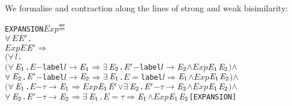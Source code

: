 \documentclass[GCNS]{yincog}
\renewcommand{\HOLConst}[1]{\texttt{#1}}
\renewcommand{\HOLBoundVar}[1]{\ensuremath{\mathit{#1}}}
\renewcommand{\HOLFreeVar}[1]{\ensuremath{\mathit{#1}}}
\renewcommand{\HOLSymConst}[1]{#1}
\renewcommand{\HOLTokenConj}{\ensuremath{\wedge}}
\renewcommand{\HOLTokenDefEquality}{\ensuremath{\mathrel{\overset{\makebox [0pt]{\text{\tiny \textsf{def}}}}{=}}}}
\renewcommand{\HOLTokenExists}{\ensuremath{\exists \,}}
\renewcommand{\HOLTokenForall}{\ensuremath{\forall \,}}
\renewcommand{\HOLTokenDisj}{\ensuremath{\vee}}
\theoremstyle{remark}
\theoremstyle{theorem}
\theoremstyle{remark}
\newcommand{\HOLTokenTransBegin}{$-$}
\newcommand{\HOLTokenTransEnd}{$\rightarrow$\xspace}
\newcommand{\HOLTokenWeakTransBegin}{$=$}
\newcommand{\HOLTokenWeakTransEnd}{$\Rightarrow$\xspace}
\renewcommand{\HOLTokenImp}{\ensuremath{\Longrightarrow}}
\begin{document}
We formalise and contraction along the lines of strong and weak bisimilarity:
%
\begin{alltt}
   \HOLConst{EXPANSION} \HOLFreeVar{Exp} \HOLTokenDefEquality{}
     \HOLSymConst{\HOLTokenForall{}}\HOLBoundVar{E} \ensuremath{\HOLBoundVar{E}\sp{\prime}}.
         \HOLFreeVar{Exp} \HOLBoundVar{E} \ensuremath{\HOLBoundVar{E}\sp{\prime}} \HOLSymConst{\HOLTokenImp{}}
         \ensuremath{(}\HOLSymConst{\HOLTokenForall{}}\HOLBoundVar{l}.
              \ensuremath{(}\HOLSymConst{\HOLTokenForall{}}\ensuremath{\HOLBoundVar{E}\sb{\mathrm{1}}}. \HOLBoundVar{E} \HOLTokenTransBegin\HOLConst{label} \HOLBoundVar{l}\HOLTokenTransEnd \ensuremath{\HOLBoundVar{E}\sb{\mathrm{1}}} \HOLSymConst{\HOLTokenImp{}} \HOLSymConst{\HOLTokenExists{}}\ensuremath{\HOLBoundVar{E}\sb{\mathrm{2}}}. \ensuremath{\HOLBoundVar{E}\sp{\prime}} \HOLTokenTransBegin\HOLConst{label} \HOLBoundVar{l}\HOLTokenTransEnd \ensuremath{\HOLBoundVar{E}\sb{\mathrm{2}}} \HOLSymConst{\HOLTokenConj{}} \HOLFreeVar{Exp} \ensuremath{\HOLBoundVar{E}\sb{\mathrm{1}}} \ensuremath{\HOLBoundVar{E}\sb{\mathrm{2}}}\ensuremath{)} \HOLSymConst{\HOLTokenConj{}}
              \HOLSymConst{\HOLTokenForall{}}\ensuremath{\HOLBoundVar{E}\sb{\mathrm{2}}}. \ensuremath{\HOLBoundVar{E}\sp{\prime}} \HOLTokenTransBegin\HOLConst{label} \HOLBoundVar{l}\HOLTokenTransEnd \ensuremath{\HOLBoundVar{E}\sb{\mathrm{2}}} \HOLSymConst{\HOLTokenImp{}} \HOLSymConst{\HOLTokenExists{}}\ensuremath{\HOLBoundVar{E}\sb{\mathrm{1}}}. \HOLBoundVar{E} \HOLTokenWeakTransBegin\HOLConst{label} \HOLBoundVar{l}\HOLTokenWeakTransEnd \ensuremath{\HOLBoundVar{E}\sb{\mathrm{1}}} \HOLSymConst{\HOLTokenConj{}} \HOLFreeVar{Exp} \ensuremath{\HOLBoundVar{E}\sb{\mathrm{1}}} \ensuremath{\HOLBoundVar{E}\sb{\mathrm{2}}}\ensuremath{)} \HOLSymConst{\HOLTokenConj{}}
         \ensuremath{(}\HOLSymConst{\HOLTokenForall{}}\ensuremath{\HOLBoundVar{E}\sb{\mathrm{1}}}. \HOLBoundVar{E} \HOLTokenTransBegin\HOLSymConst{\ensuremath{\tau}}\HOLTokenTransEnd \ensuremath{\HOLBoundVar{E}\sb{\mathrm{1}}} \HOLSymConst{\HOLTokenImp{}} \HOLFreeVar{Exp} \ensuremath{\HOLBoundVar{E}\sb{\mathrm{1}}} \ensuremath{\HOLBoundVar{E}\sp{\prime}} \HOLSymConst{\HOLTokenDisj{}} \HOLSymConst{\HOLTokenExists{}}\ensuremath{\HOLBoundVar{E}\sb{\mathrm{2}}}. \ensuremath{\HOLBoundVar{E}\sp{\prime}} \HOLTokenTransBegin\HOLSymConst{\ensuremath{\tau}}\HOLTokenTransEnd \ensuremath{\HOLBoundVar{E}\sb{\mathrm{2}}} \HOLSymConst{\HOLTokenConj{}} \HOLFreeVar{Exp} \ensuremath{\HOLBoundVar{E}\sb{\mathrm{1}}} \ensuremath{\HOLBoundVar{E}\sb{\mathrm{2}}}\ensuremath{)} \HOLSymConst{\HOLTokenConj{}}
         \HOLSymConst{\HOLTokenForall{}}\ensuremath{\HOLBoundVar{E}\sb{\mathrm{2}}}. \ensuremath{\HOLBoundVar{E}\sp{\prime}} \HOLTokenTransBegin\HOLSymConst{\ensuremath{\tau}}\HOLTokenTransEnd \ensuremath{\HOLBoundVar{E}\sb{\mathrm{2}}} \HOLSymConst{\HOLTokenImp{}} \HOLSymConst{\HOLTokenExists{}}\ensuremath{\HOLBoundVar{E}\sb{\mathrm{1}}}. \HOLBoundVar{E} \HOLTokenWeakTransBegin\HOLSymConst{\ensuremath{\tau}}\HOLTokenWeakTransEnd \ensuremath{\HOLBoundVar{E}\sb{\mathrm{1}}} \HOLSymConst{\HOLTokenConj{}} \HOLFreeVar{Exp} \ensuremath{\HOLBoundVar{E}\sb{\mathrm{1}}} \ensuremath{\HOLBoundVar{E}\sb{\mathrm{2}}}\hfill{[EXPANSION]}
\end{alltt}
\end{document}
